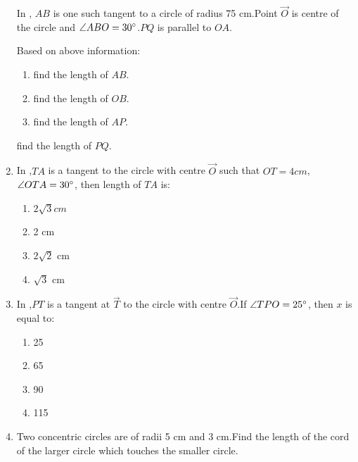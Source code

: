 \documentclass[12pt,A4 paper]{article}
\begin{document}
\begin{enumerate}
In , $AB$ is one such tangent to a circle of radius 75 cm.Point $\vec{ O}$ is centre of the circle and $\angle ABO= 30\degree$.$PQ$ is parallel to $OA$.



\begin{figure}[H]
	        \centering
	        
		\caption{}
		\label{fig:fig:7}
        \end{figure}



Based on above information:

           \begin{enumerate}
		   \item find the length of $AB$.
		   \item find the length of $OB$.
		   \item find the length of $AP$.
         \end{enumerate}


find the length of $PQ$.



\item In ,$TA$ is a tangent to the circle with centre $\vec{O}$ such that $OT=4cm$, $\angle OTA= 30\degree$, then length of $TA$ is:
      \begin{enumerate}
          \item $2\sqrt3 cm$
          \item 2 cm
          \item $2\sqrt2$ cm
          \item $\sqrt3$ cm
      \end{enumerate}




  \begin{figure}[H]
	\centering
	
	\caption{}
	\label{fig:fig:8}
  \end{figure}





\item In ,$PT$ is a tangent at $\vec{T}$ to the circle with centre $\vec{O}$.If $\angle TPO=25\degree$, then $x$ is equal to:
   \begin{enumerate}
       \item 25\degree
       \item 65\degree
       \item 90\degree
       \item 115\degree
       
   \end{enumerate}




\begin{figure}[H]
	        \centering
	        
		\caption{}
		\label{fig:fig:9}
\end{figure}






\item Two concentric circles are of radii 5 cm and 3 cm.Find the length of the cord of the larger circle which touches the smaller circle.

         
\end{enumerate}
\end{document}
